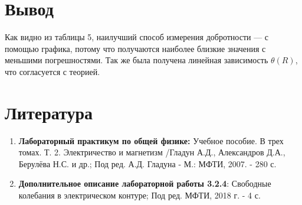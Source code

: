 \documentclass[a4paper, 12pt]{article}%
\begin{document}
\newpage

\section{Вывод}

Как видно из таблицы 5, наилучший способ измерения добротности --- с помощью графика, потому что получаются наиболее близкие значения с меньшими погрешностями. Так же была получена линейная зависимость $\theta(R)$, что согласуется с теорией.

\section{Литература}

\begin{enumerate}
\item \textbf{Лабораторный практикум по общей физике:} Учебное пособие. В трех томах. Т. 2. Электричество и магнетизм /Гладун А.Д., Александров Д.А., Берулёва Н.С. и др.; Под ред. А.Д. Гладуна - М.: МФТИ, 2007. - 280 с.
\item \textbf{Дополнительное описание лабораторной работы 3.2.4}: Свободные колебания в электрическом контуре; Под ред. МФТИ, 2018 г. - 4 с.
\end{enumerate}

					
\end{document}
